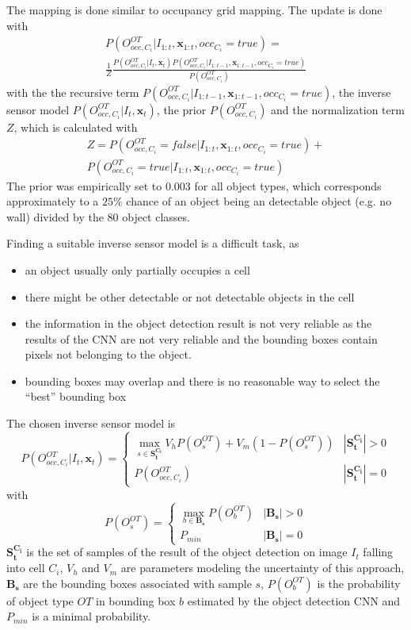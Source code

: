The mapping is done similar to occupancy grid mapping. The update is done with
\begin{multline}
 P(O_{occ,C_i}^{OT}|I_{1:t}, \mathbf{x}_{1:t},occ_{C_i}=true) = \\ \frac{1}{Z} \frac{P(O_{occ,C_i}^{OT}|I_{t}, \mathbf{x}_{t})P(O_{occ,C_i}^{OT}|I_{1:t-1}, \mathbf{x}_{1:t-1},occ_{C_i}=true)}{P(O_{occ,C_i}^{OT})}  
\end{multline}
with the the recursive term $P(O_{occ,C_i}^{OT}|I_{1:t-1}, \mathbf{x}_{1:t-1},occ_{C_i}=true)$, the inverse sensor model $P(O_{occ,C_i}^{OT}|I_{t}, \mathbf{x}_{t})$, the prior $P(O_{occ,C_i}^{OT})$ and the normalization term $Z$, which is calculated with
\begin{multline}
 Z=P(O_{occ,C_i}^{OT}=false|I_{1:t}, \mathbf{x}_{1:t},occ_{C_i}=true)+\\P(O_{occ,C_i}^{OT}=true|I_{1:t}, \mathbf{x}_{1:t},occ_{C_i}=true)
\end{multline}
The prior was empirically set to $0.003$ for all object types, which corresponds approximately to a $25\%$ chance of an object being an detectable object (e.g. no wall) divided by the 80 object classes.

Finding a suitable inverse sensor model is a difficult task, as
\begin{itemize}
 \item an object usually only partially occupies a cell
 \item there might be other detectable or not detectable objects in the cell
 \item the information in the object detection result is not very reliable as the results of the CNN are not very reliable and the bounding boxes contain pixels not belonging to the object. 
 \item bounding boxes may overlap and there is no reasonable way to select the ``best'' bounding box 
\end{itemize}

The chosen inverse sensor model is
\begin{equation}
 P(O_{occ,C_i}^{OT}|I_{t}, \mathbf{x}_{t})=\begin{cases}\max_{s \in \mathbf{S_t^{C_i}}} V_hP(O_{s}^{OT})+V_m(1-P(O_{s}^{OT})) & |\mathbf{S_t^{C_i}}| > 0 \\P(O_{occ,C_i}^{OT}) & |\mathbf{S_t^{C_i}}| = 0 \end{cases}                                            
\end{equation}
with
\begin{equation}
P(O_{s}^{OT})=\begin{cases}\max_{b \in \mathbf{B_s}} P(O_{b}^{OT}) & |\mathbf{B_s}| > 0 \\P_{min} & |\mathbf{B_s}
| = 0 \end{cases}
\end{equation} 
$\mathbf{S_t^{C_i}}$ is the set of samples of the result of the object detection on image $I_t$ falling into cell $C_i$, $V_h$ and $V_m$ are parameters modeling the uncertainty of this approach, $\mathbf{B_s}$ are the bounding boxes associated with sample $s$, $P(O_{b}^{OT})$ is the probability of object type $OT$ in bounding box $b$ estimated by the object detection CNN and $P_{min}$ is a minimal probability. 

